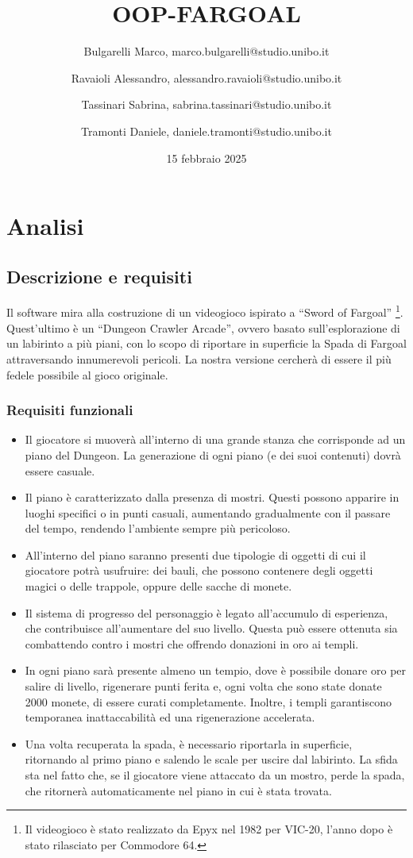 \documentclass{report}
\title{OOP-FARGOAL}
\author{
    Bulgarelli Marco, marco.bulgarelli@studio.unibo.it \and 
    Ravaioli Alessandro, alessandro.ravaioli@studio.unibo.it \and
    Tassinari Sabrina, sabrina.tassinari@studio.unibo.it \and
    Tramonti Daniele, daniele.tramonti@studio.unibo.it 
}
\date{15 febbraio 2025}
\begin{document}
\maketitle

\tableofcontents

\chapter{Analisi}

\section{Descrizione e requisiti}

Il software mira alla costruzione di un videogioco ispirato a “Sword of Fargoal” \footnote{
    Il videogioco è stato realizzato da Epyx nel 1982 per VIC-20, l'anno dopo è stato rilasciato per Commodore 64.
}. 
%
Quest’ultimo è un “Dungeon Crawler Arcade”, ovvero basato sull’esplorazione di un labirinto a più piani, con lo scopo di riportare in superficie la Spada di Fargoal attraversando innumerevoli pericoli. 
%
La nostra versione cercherà di essere il più fedele possibile al gioco originale.

\subsection{Requisiti funzionali}
\begin{itemize}
    \item Il giocatore si muoverà all’interno di una grande stanza che corrisponde ad un piano del Dungeon. La generazione di ogni piano (e dei suoi contenuti) dovrà essere casuale.
    \item Il piano è caratterizzato dalla presenza di mostri. Questi possono apparire in luoghi specifici o in punti casuali, aumentando gradualmente con il passare del tempo, rendendo l’ambiente sempre più pericoloso.
    \item All’interno del piano saranno presenti due tipologie di oggetti di cui il giocatore potrà usufruire: dei bauli, che possono contenere degli oggetti magici o delle trappole, oppure delle sacche di monete.
    \item Il sistema di progresso del personaggio è legato all’accumulo di esperienza, che contribuisce all’aumentare del suo livello. Questa può essere ottenuta sia combattendo contro i mostri che offrendo donazioni in oro ai templi.
    \item In ogni piano sarà presente almeno un tempio, dove è possibile donare oro per salire di livello, rigenerare punti ferita e, ogni volta che sono state donate 2000 monete, di essere curati completamente. Inoltre, i templi garantiscono temporanea inattaccabilità ed una rigenerazione accelerata.
    \item Una volta recuperata la spada, è necessario riportarla in superficie, ritornando al primo piano e salendo le scale per uscire dal labirinto. La sfida sta nel fatto che, se il giocatore viene attaccato da un mostro, perde la spada, che ritornerà automaticamente nel piano in cui è stata trovata.
\end{itemize}
\end{document}

